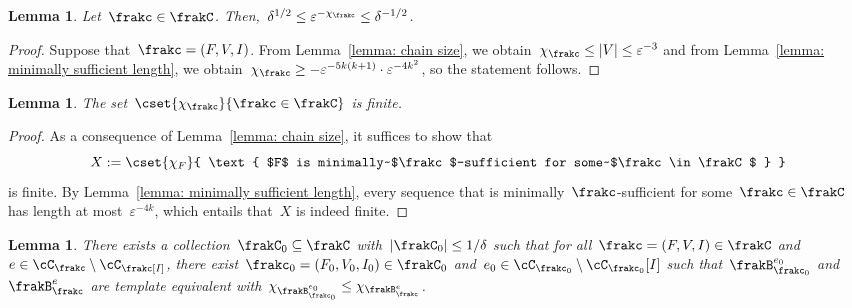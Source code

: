 \documentclass[11pt]{amsart}
\newcommand{\eps}{\varepsilon}
\DeclarePairedDelimiter{\abs}{\lvert}{\rvert}
\newtheorem{lemma}[algocf]{Lemma}
\theoremstyle{definition}
\numberwithin{equation}{section}
\begin{document}
	\begin{lemma}\label{lemma: error parameter bound}
		Let~$\frakc\in\frakC$.
		Then,~$\delta^{1/2}\leq \eps^{-\chi_\frakc}\leq \delta^{-1/2}$.
	\end{lemma}
	\begin{proof}
		Suppose that~$\frakc=(F,V,I)$.
		From Lemma~\ref{lemma: chain size}, we obtain~$\chi_\frakc\leq \abs{V}\leq \eps^{-3}$ and from Lemma~\ref{lemma: minimally sufficient length}, we obtain~$\chi_\frakc\geq -\eps^{-5k(k+1)}\cdot \eps^{-4k^2}$, so the statement follows.
	\end{proof}
	
	
	\begin{lemma}\label{lemma: finite error parameters}
		The set~$\cset{ \chi_\frakc }{ \frakc\in\frakC }$ is finite.
	\end{lemma}
	\begin{proof}
		As a consequence of Lemma~\ref{lemma: chain size}, it suffices to show that
		\begin{equation*}
			X:=\cset{ \chi_F }{ \text{ $F$ is minimally~$\frakc$-sufficient for some~$\frakc\in\frakC$ } }
		\end{equation*}
		is finite.
		By Lemma~\ref{lemma: minimally sufficient length}, every sequence that is minimally~$\frakc$-sufficient for some~$\frakc\in\frakC$ has length at most~$\eps^{-4k}$, which entails that~$X$ is indeed finite.
	\end{proof}
	\begin{lemma}\label{lemma: finite branching collection}
		There exists a collection~$\frakC_0\subseteq\frakC$ with~$\abs{\frakC_0}\leq 1/\delta$ such that for all~$\frakc=(F,V,I)\in\frakC$ and~$e\in\cC_\frakc\setminus\cC_\frakc[I]$, there exist~$\frakc_0=(F_0,V_0,I_0)\in\frakC_0$ and~$e_0\in\cC_{\frakc_0}\setminus\cC_{\frakc_0}[I]$ such that~$\frakB_{\frakc_0}^{e_0}$ and~$\frakB_\frakc^e$ are template equivalent with~$\chi_{\frakB_{\frakc_0}^{e_0}}\leq \chi_{\frakB_{\frakc}^{e}}$.
	\end{lemma}
\end{document}
